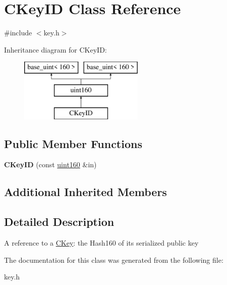 \hypertarget{class_c_key_i_d}{}\section{C\+Key\+ID Class Reference}
\label{class_c_key_i_d}


{\ttfamily \#include $<$key.\+h$>$}

Inheritance diagram for C\+Key\+ID\+:\begin{figure}[H]
\begin{center}
\leavevmode
\includegraphics[height=3.000000cm]{class_c_key_i_d}
\end{center}
\end{figure}
\subsection*{Public Member Functions}
\begin{DoxyCompactItemize}
\item 
\mbox{\label{class_c_key_i_d_a695f373e11730318f9103100fa006a7e}} 
{\bfseries C\+Key\+ID} (const \mbox{\hyperlink{classuint160}{uint160}} \&in)
\end{DoxyCompactItemize}
\subsection*{Additional Inherited Members}


\subsection{Detailed Description}
A reference to a \mbox{\hyperlink{class_c_key}{C\+Key}}\+: the Hash160 of its serialized public key 

The documentation for this class was generated from the following file\+:\begin{DoxyCompactItemize}
\item 
key.\+h\end{DoxyCompactItemize}

